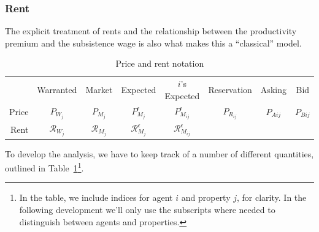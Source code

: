 \subsubsection{Rent} \label{section-rent}
The explicit treatment of rents and the relationship between the productivity \gls{premium} and the \gls{subsistence wage}
is also what makes this a ``\gls{classical}'' model. 


\begin{table}[!ht]
\centering
{\renewcommand{\arraystretch}{1.6}
\begin{tabular}{r|c|c|c|c|c|c|c|}\cline{2-8}
       & Warranted  & Market & Expected & $i$'s Expected & Reservation & Asking & Bid     \\ \cline{2-8}
Price  & $P_{W_j}$      & $P_{M_j}$  & $P_{M_j}^\epsilon$ & $P_{M_{ij}}^{\epsilon}$     & $P_{R_{ij}}$       & $P_{A{ij}}$  & $P_{B{ij}}$   \\ \cline{2-8}
Rent  & $\mathcal{R}_{W_j}$      & $\mathcal{R}_{M_j}$  & $\mathcal{R}_{M_j}^\epsilon$ & $\mathcal{R}_{M_{ij}}^{\epsilon}$     &       &   &   \\ \cline{2-8}
\end{tabular}
 }   
\caption{Price and rent notation}
\label{table-price-notation}
\end{table}


To develop the analysis, we have to keep track of a number of different quantities, outlined in Table~\ref{table-price-notation}\footnote{In the table, we include indices for agent $i$ and property $j$, for clarity. In the following development we'll only use the subscripts where needed to distinguish between agents and properties.}. 

